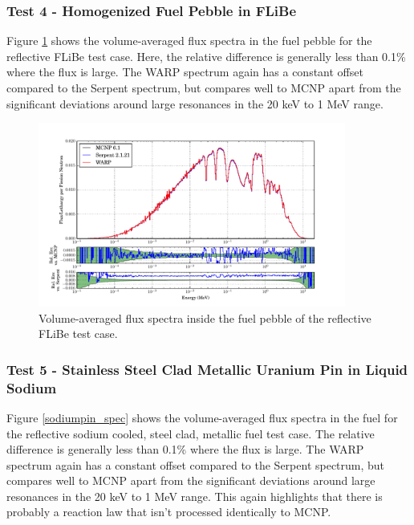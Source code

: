 \documentclass[preprint,12pt]{elsarticle}
\begin{document}
\newpage
\subsubsection{Test 4 - Homogenized Fuel Pebble in FLiBe}

Figure \ref{flibe_spec} shows the volume-averaged flux spectra in the fuel pebble for the reflective FLiBe test case.  Here, the relative difference is generally less than 0.1\% where the flux is large.  The WARP spectrum again has a constant offset compared to the Serpent spectrum, but compares well to MCNP apart from the significant deviations around large resonances in the 20 keV to 1 MeV range.  

\begin{figure}[h!]
\centering
\includegraphics[width=0.9\textwidth,trim= 1cm 0cm 1cm 0cm]{graphics/flibe_spec.pdf}
\caption{Volume-averaged flux spectra inside the fuel pebble of the reflective FLiBe test case. \label{flibe_spec} }
\end{figure}

\newpage
\subsubsection{Test 5 - Stainless Steel Clad Metallic Uranium Pin in Liquid Sodium}

Figure \ref{sodiumpin_spec} shows the volume-averaged flux spectra in the fuel for the reflective sodium cooled, steel clad, metallic fuel test case.  The relative difference is generally less than 0.1\% where the flux is large.  The WARP spectrum again has a constant offset compared to the Serpent spectrum, but compares well to MCNP apart from the significant deviations around large resonances in the 20 keV to 1 MeV range.  This again highlights that there is probably a reaction law that isn't processed identically to MCNP.
\end{document}
